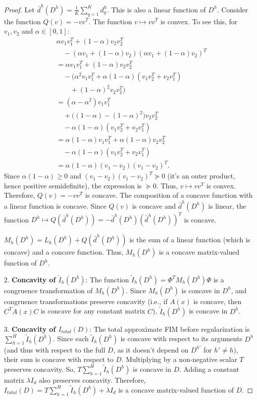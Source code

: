 \documentclass{article}
\begin{document}
\begin{proof}
    Let $\bar{d}^h(D^h) = \frac{1}{K}\sum_{q=1}^K d^h_q$. This is also a linear function of $D^h$.
    Consider the function $Q(v) = -vv^T$. The function $v \mapsto vv^T$ is convex. To see this, for $v_1, v_2$ and $\alpha \in [0,1]$:
    \begin{align*}
        &\alpha v_1 v_1^T + (1-\alpha) v_2 v_2^T \\
        &\quad - (\alpha v_1 + (1-\alpha) v_2)(\alpha v_1 + (1-\alpha) v_2)^T \\
        &= \alpha v_1 v_1^T + (1-\alpha) v_2 v_2^T \\
        &\quad - \big(\alpha^2 v_1 v_1^T + \alpha(1-\alpha)(v_1 v_2^T + v_2 v_1^T) \\
        &\qquad + (1-\alpha)^2 v_2 v_2^T\big) \\
        &= (\alpha - \alpha^2) v_1 v_1^T \\
        &\quad + \big((1-\alpha) - (1-\alpha)^2\big) v_2 v_2^T \\
        &\quad - \alpha(1-\alpha)(v_1 v_2^T + v_2 v_1^T) \\
        &= \alpha(1-\alpha) v_1 v_1^T + \alpha(1-\alpha) v_2 v_2^T \\
        &\quad - \alpha(1-\alpha)(v_1 v_2^T + v_2 v_1^T) \\
        &= \alpha(1-\alpha) (v_1 - v_2)(v_1 - v_2)^T.
    \end{align*}
    Since $\alpha(1-\alpha) \ge 0$ and $(v_1 - v_2)(v_1 - v_2)^T \succeq 0$ (it's an outer product, hence positive semidefinite), the expression is $\succeq 0$. Thus, $v \mapsto vv^T$ is convex.
    Therefore, $Q(v) = -vv^T$ is concave.
    The composition of a concave function with a linear function is concave. Since $Q(v)$ is concave and $\bar{d}^h(D^h)$ is linear, the function $D^h \mapsto Q(\bar{d}^h(D^h)) = -\bar{d}^h(D^h)(\bar{d}^h(D^h))^T$ is concave.

    $M_h(D^h) = L_h(D^h) + Q(\bar{d}^h(D^h))$ is the sum of a linear function (which is concave) and a concave function. Thus, $M_h(D^h)$ is a concave matrix-valued function of $D^h$.

2.  \textbf{Concavity of $\tilde{I}_h(D^h)$}:
    The function $\tilde{I}_h(D^h) = \Phi^T M_h(D^h) \Phi$ is a congruence transformation of $M_h(D^h)$. Since $M_h(D^h)$ is concave in $D^h$, and congruence transformations preserve concavity (i.e., if $A(x)$ is concave, then $C^T A(x) C$ is concave for any constant matrix $C$), $\tilde{I}_h(D^h)$ is concave in $D^h$.

3.  \textbf{Concavity of $I_{total}(D)$}:
    The total approximate FIM before regularization is $\sum_{h=1}^H \tilde{I}_h(D^h)$. Since each $\tilde{I}_h(D^h)$ is concave with respect to its arguments $D^h$ (and thus with respect to the full $D$, as it doesn't depend on $D^{h'}$ for $h' \neq h$), their sum is concave with respect to $D$.
    Multiplying by a non-negative scalar $T$ preserves concavity. So, $T \sum_{h=1}^H \tilde{I}_h(D^h)$ is concave in $D$.
    Adding a constant matrix $\lambda I_d$ also preserves concavity.
    Therefore, $I_{total}(D) = T \sum_{h=1}^H \tilde{I}_h(D^h) + \lambda I_d$ is a concave matrix-valued function of $D$.


\end{proof}
\end{document}
